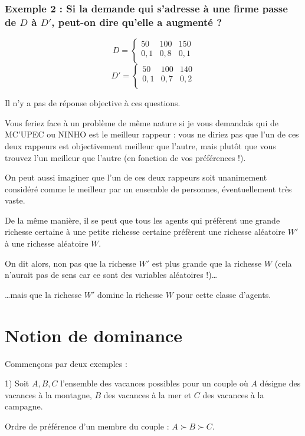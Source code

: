 \documentclass[a4paper, 12pt]{report}
\begin{document}
\subsubsection{Exemple 2 : Si la demande qui s'adresse à une firme passe de \( D \) à \( D' \), peut-on dire qu'elle a augmenté ?}
\[
D = \left\{\begin{matrix}
	50 & 100 & 150  \\
	0,1 & 0,8  & 0,1  \\
\end{matrix}\right.
\]
\[
D' = 
\left\{\begin{matrix}
	50 & 100 & 140 \\
	0,1 & 0,7  & 0,2  \\
\end{matrix}\right.
\]

Il n'y a pas de réponse objective à ces questions.

Vous feriez face à un problème de même nature si je vous demandais qui de MC’UPEC ou NINHO est le meilleur rappeur : vous ne diriez pas que l'un de ces deux rappeurs est objectivement meilleur que l'autre, mais plutôt que vous trouvez l'un meilleur que l'autre (en fonction de vos préférences !).

On peut aussi imaginer que l'un de ces deux rappeurs soit unanimement considéré comme le meilleur par un ensemble de personnes, éventuellement très vaste.

De la même manière, il se peut que tous les agents qui préfèrent une grande richesse certaine à une petite richesse certaine préfèrent une richesse aléatoire \( W' \) à une richesse aléatoire \( W \).

On dit alors, non pas que la richesse \( W' \) est plus grande que la richesse \( W \) (cela n'aurait pas de sens car ce sont des variables aléatoires !)… 

…mais que la richesse \( W' \) domine la richesse \( W \) pour cette classe d'agents.

\section{Notion de dominance}

Commençons par deux exemples :

1) Soit \( A, B, C \) l'ensemble des vacances possibles pour un couple où \( A \) désigne des vacances à la montagne, \( B \) des vacances à la mer et \( C \) des vacances à la campagne.

Ordre de préférence d'un membre du couple : \( A \succ B \succ C \).
\end{document}
